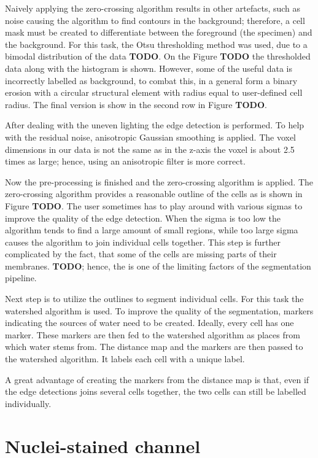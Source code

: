 \documentclass[
  digital,     %
  oneside,     %
  nosansbold,  %
  nocolorbold, %
  lof,         %
  lot,         %
]{fithesis4}
\begin{document}
Naively applying the zero-crossing algorithm results in other artefacts, such
as noise causing the algorithm to find contours in the background; therefore,
a cell mask must be created to differentiate between the foreground (the
specimen) and the background. For this task, the Otsu thresholding method was
used, due to a bimodal distribution of the data \textbf{TODO}. On the Figure
\textbf{TODO} the thresholded data along with the histogram is shown. However,
some of the useful data is incorrectly labelled as background, to combat this, in
a general form a binary erosion with a circular structural element with radius
equal to user-defined cell radius. The final version is show in the second row
in Figure \textbf{TODO}.

After dealing with the uneven lighting the edge detection is performed. To help
with the residual noise, anisotropic Gaussian smoothing is applied. The voxel
dimensions in our data is not the same as in the z-axis the voxel is about 2.5
times as large; hence, using an anisotropic filter is more correct. 

Now the pre-processing is finished and the zero-crossing algorithm is applied.
The zero-crossing algorithm provides a reasonable outline of the cells as is
shown in Figure \textbf{TODO}. The user sometimes has to play around with
various sigmas to improve the quality of the edge detection. When the sigma is
too low the algorithm tends to find a large amount of small regions, while too
large sigma causes the algorithm to join individual cells together. This step
is further complicated by the fact, that some of the cells are missing parts of
their membranes. \textbf{TODO}; hence, the is one of the limiting factors of
the segmentation pipeline.

Next step is to utilize the outlines to segment individual cells. For this task
the watershed algorithm is used. To improve the quality of the segmentation,
markers indicating the sources of water need to be created. Ideally, every cell
has one marker. These markers are then fed to the watershed algorithm as places
from which water stems from. %
The distance map and the markers are then passed to the
watershed algorithm. It labels each cell with a unique label.

A great advantage of creating the markers from the distance map is that, even if
the edge detections joins several cells together, the two cells can still be
labelled individually.

\section{Nuclei-stained channel}
\end{document}
